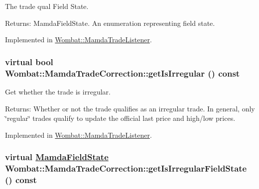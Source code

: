 The trade qual Field State. 

\begin{Desc}
\item[Returns:]Mamda\-Field\-State. An enumeration representing field state. \end{Desc}


Implemented in \hyperlink{classWombat_1_1MamdaTradeListener_958ea55776c3afa0a572b8819d9c04c8}{Wombat::Mamda\-Trade\-Listener}.\hypertarget{classWombat_1_1MamdaTradeCorrection_93bee89c9e9aad779b055f2d168c2283}{
\subsubsection[getIsIrregular]{\setlength{\rightskip}{0pt plus 5cm}virtual bool Wombat::Mamda\-Trade\-Correction::get\-Is\-Irregular () const}}
\label{classWombat_1_1MamdaTradeCorrection_93bee89c9e9aad779b055f2d168c2283}


Get whether the trade is irregular. 

\begin{Desc}
\item[Returns:]Whether or not the trade qualifies as an irregular trade. In general, only \char`\"{}regular\char`\"{} trades qualify to update the official last price and high/low prices. \end{Desc}


Implemented in \hyperlink{classWombat_1_1MamdaTradeListener_1a5b54d3d63c62bf8720cc29dd40b25a}{Wombat::Mamda\-Trade\-Listener}.\hypertarget{classWombat_1_1MamdaTradeCorrection_50f8278176ef9d0f2eba3bda2f299fdd}{
\subsubsection[getIsIrregularFieldState]{\setlength{\rightskip}{0pt plus 5cm}virtual \hyperlink{namespaceWombat_93aac974f2ab713554fd12a1fa3b7d2a}{Mamda\-Field\-State} Wombat::Mamda\-Trade\-Correction::get\-Is\-Irregular\-Field\-State () const}}
\label{classWombat_1_1MamdaTradeCorrection_50f8278176ef9d0f2eba3bda2f299fdd}


